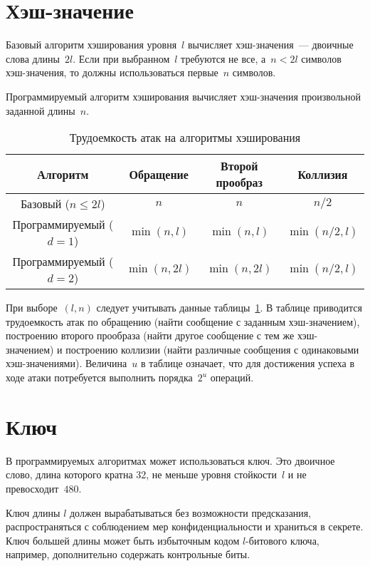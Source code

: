 \section{Хэш-значение}\label{COMMON.Hash}

Базовый алгоритм хэширования уровня~$l$ вычисляет хэш-значения~---
двоичные слова длины~$2l$. 
%
Если при выбранном~$l$ требуются не все, а~$n<2l$ символов 
хэш-значения, то должны использоваться первые~$n$ символов.

Программируемый алгоритм хэширования вычисляет хэш-значения 
произвольной заданной длины~$n$.

\begin{table}[hbt]
\caption{Трудоемкость атак на алгоритмы хэширования}\label{Table.COMMON.Hash}
\begin{tabular}{|c|c|c|c|}
\hline
Алгоритм & Обращение & Второй прообраз & Коллизия\\
\hline
\hline
Базовый ($n\leq 2l$) & $n$ & $n$ & $n/2$\\
Программируемый ($d=1$) & $\min(n,l)$ & $\min(n,l)$ & $\min(n/2,l)$\\
Программируемый ($d=2$) & $\min(n,2l)$ & $\min(n,2l)$ & $\min(n/2,l)$\\
\hline
\end{tabular}
\end{table}

При выборе~$(l,n)$ следует учитывать данные таблицы~\ref{Table.COMMON.Hash}.
В таблице приводится трудоемкость атак по 
обращению (найти сообщение с заданным хэш-значением),
построению второго прообраза (найти другое сообщение с тем же хэш-значением)
и построению коллизии (найти различные сообщения с одинаковыми хэш-значениями).
%
Величина~$u$ в таблице означает, что для достижения успеха в ходе атаки 
потребуется выполнить порядка~$2^u$ операций.

\section{Ключ}\label{COMMON.Key}

В программируемых алгоритмах может использоваться ключ.
%
Это двоичное слово, длина которого кратна 32, не меньше уровня стойкости~$l$ 
и не превосходит~$480$. 

Ключ длины $l$ должен вырабатываться без возможности предсказания, 
распространяться с соблюдением мер конфиденциальности и храниться в секрете.
%
Ключ большей длины может быть избыточным кодом $l$-битового 
ключа, например, дополнительно содержать контрольные биты.

